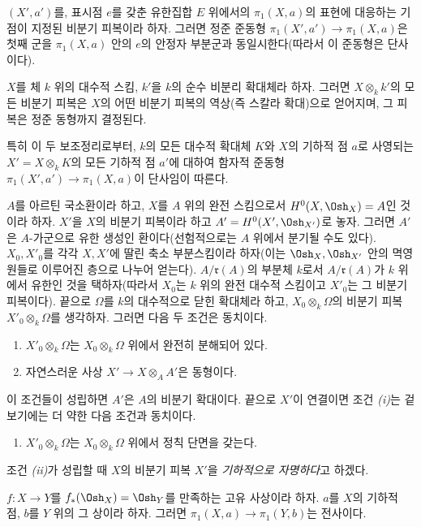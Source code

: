  $(X',a')$를, 표시점 $e$를 갖춘 유한집합 $E$
위에서의 $\pi_1(X,a)$의 표현에 대응하는 기점이 지정된 비분기 피복이라
하자. 그러면 정준 준동형
$\pi_1(X',a')\longrightarrow\pi_1(X,a)$은 첫째 군을 $\pi_1(X,a)$ 안의
$e$의 안정자 부분군과 동일시한다(따라서 이 준동형은 단사이다).

 $X$를 체 $k$ 위의 대수적 스킴, $k'$을 $k$의
순수 비분리 확대체라 하자. 그러면 $X\otimes_k k'$의 모든 비분기 피복은
$X$의 어떤 비분기 피복의 역상(즉 스칼라 확대)으로 얻어지며, 그 피복은
정준 동형까지 결정된다.

특히 이 두 보조정리로부터, $k$의 모든 대수적 확대체 $K$와
$X$의 기하적 점 $a$로 사영되는 $X'=X\otimes_k K$의 모든 기하적 점
$a'$에 대하여 함자적 준동형
$\pi_1(X',a')\longrightarrow\pi_1(X,a)$이 단사임이 따른다.

 $A$를 아르틴 국소환이라 하고, $X$를 $A$ 위의
완전 스킴으로서 $H^0(X,\Osh_X)=A$인 것이라 하자. $X'$을 $X$의 비분기
피복이라 하고 $A'=H^0(X',\Osh_{X'})$로 놓자. 그러면 $A'$은
$A$-가군으로 유한 생성인 환이다(선험적으로는 $A$ 위에서 분기될 수도
있다). $X_0,X'_0$를 각각 $X,X'$에 딸린 축소 부분스킴이라 하자(이는
$\Osh_X,\Osh_{X'}$ 안의 멱영원들로 이루어진 층으로 나누어 얻는다).
$A/\mathfrak r(A)$의 부분체 $k$로서 $A/\mathfrak r(A)$가 $k$ 위에서
유한인 것을 택하자(따라서 $X_0$는 $k$ 위의 완전 대수적 스킴이고
$X'_0$는 그 비분기 피복이다). 끝으로 $\Omega$를 $k$의 대수적으로 닫힌
확대체라 하고, $X_0\otimes_k\Omega$의 비분기 피복
$X'_0\otimes_k\Omega$를 생각하자. 그러면 다음 두 조건은 동치이다.
\begin{enumerate}
  \item[\textit{i.}] $X'_0\otimes_k\Omega$는
    $X_0\otimes_k\Omega$ 위에서 완전히 분해되어 있다.
  \item[\textit{ii.}] 자연스러운 사상
    $X'\longrightarrow X\otimes_A A'$은 동형이다.
\end{enumerate}
이 조건들이 성립하면 $A'$은 $A$의 비분기 확대이다. 끝으로 $X'$이
연결이면 조건 \textit{(i)}는 겉보기에는 더 약한 다음 조건과 동치이다.
\begin{enumerate}
  \item[\textit{i bis.}] $X'_0\otimes_k\Omega$는
    $X_0\otimes_k\Omega$ 위에서 정칙 단면을 갖는다.
\end{enumerate}
조건 \textit{(ii)}가 성립할 때 $X$의 비분기 피복 $X'$을
\emph{기하적으로 자명하다}고 하겠다.

 $f:X\longrightarrow Y$를
$f_*(\Osh_X)=\Osh_Y$를 만족하는 고유 사상이라 하자. $a$를 $X$의
기하적 점, $b$를 $Y$ 위의 그 상이라 하자. 그러면
$\pi_1(X,a)\longrightarrow\pi_1(Y,b)$는 전사이다.

